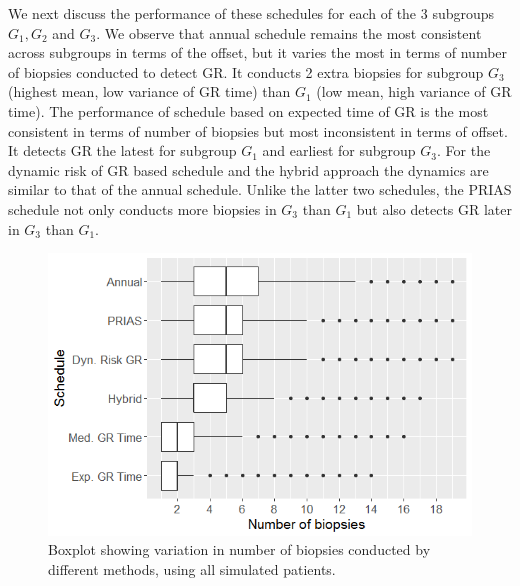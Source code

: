 We next discuss the performance of these schedules for each of the 3 subgroups $G_1, G_2$ and $G_3$. We observe that annual schedule remains the most consistent across subgroups in terms of the offset, but it varies the most in terms of number of biopsies conducted to detect GR. It conducts 2 extra biopsies for subgroup $G_3$ (highest mean, low variance of GR time) than $G_1$ (low mean, high variance of GR time). The performance of schedule based on expected time of GR is the most consistent in terms of number of biopsies but most inconsistent in terms of offset. It detects GR the latest for subgroup $G_1$ and earliest for subgroup $G_3$. For the dynamic risk of GR based schedule and the hybrid approach the dynamics are similar to that of the annual schedule. Unlike the latter two schedules, the PRIAS schedule not only conducts more biopsies in $G_3$ than $G_1$ but also detects GR later in $G_3$ than $G_1$.

\begin{figure}[!htb]
\centerline{\includegraphics[width=\columnwidth]{images/sim_study/nbBoxPlot_all.png}}
\caption{Boxplot showing variation in number of biopsies conducted by different methods, using all simulated patients.}
\label{fig : nbBoxPlot_all}
\end{figure}

